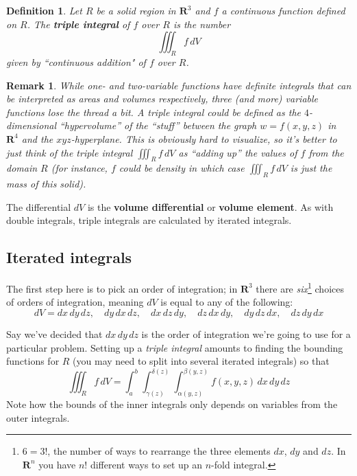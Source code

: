 \documentclass[12pt]{article}
\numberwithin{equation}{subsection}
\numberwithin{figure}{subsection}
\newtheorem{defn}[subsection]{Definition}
\theoremstyle{note}
\newtheorem{remark}[subsection]{Remark}
\begin{document}
{	\begin{defn} Let $R$ be a solid region in $\mathbf{R}^3$ and $f$ a continuous function defined on $R$. The \textbf{triple integral} of $f$ over $R$ is the number \begin{equation} \iiint_R f\,dV\end{equation} given by ``continuous addition" of $f$ over $R$.
	\end{defn}
	
	\begin{remark}While one- and two-variable functions have definite integrals that can be interpreted as areas and volumes respectively, three (and more) variable functions lose the thread a bit. A triple integral \textit{could} be defined as  the $4$-dimensional ``hypervolume'' of the ``stuff'' between the graph $w=f(x,y,z)$ in $\mathbf{R}^4$ and the $xyz$-hyperplane. This is obviously hard to visualize, so it's better to just think of the triple integral $\iiint_R f\,dV$ as ``adding up'' the values of $f$ from the domain $R$ (for instance, $f$ could be density in which case $\iiint_R f\,dV$ is just the mass of this solid). \end{remark}

The differential $dV$ is the \textbf{volume differential} or \textbf{volume element}. As with double integrals, triple integrals are calculated by iterated integrals.
	
	
\subsection{Iterated integrals}
The first step here is to pick an order of integration; in $\mathbf{R}^3$ there are \textit{six}\footnote{$6=3!$, the number of ways to rearrange the three elements $dx$, $dy$ and $dz$. In $\mathbf{R}^n$ you have $n!$ different ways to set up an $n$-fold integral.} choices of orders of integration, meaning $dV$ is equal to any of the following: \[ dV=dx\,dy\,dz, \quad dy\,dx\,dz, \quad dx\,dz\,dy, \quad dz\,dx\,dy, \quad dy\,dz\,dx, \quad dz\,dy\,dx\]

Say we've decided that $dx\,dy\,dz$ is the order of integration we're going to use for a particular problem. Setting up a \textit{triple integral} amounts to finding the bounding functions for $R$  (you may need to split into several iterated integrals) so that \begin{equation} \iiint_R f\,dV = \int_a^b \int_{\gamma(z)}^{\delta(z)}\int_{\alpha(y,z)}^{\beta(y,z)} f(x,y,z)\,dx\,dy\,dz\end{equation} Note how the bounds of the inner integrals only depends on variables from the outer integrals. 

}
\end{document}
